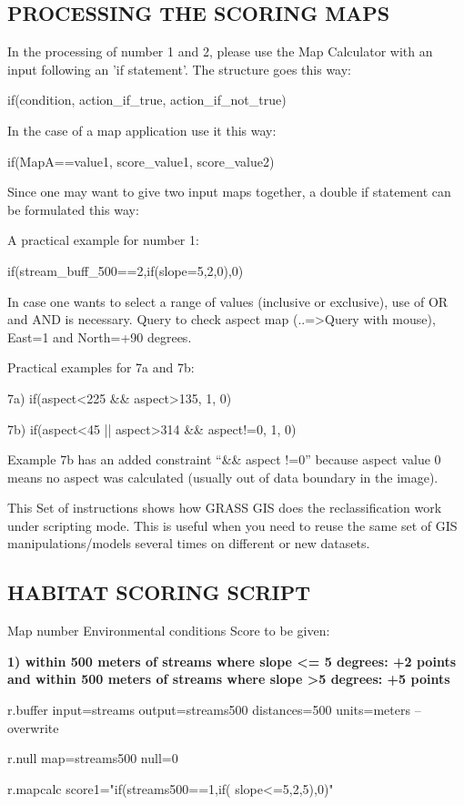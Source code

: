 \subsection{PROCESSING THE SCORING MAPS}

In the processing of number 1 and 2, please use the Map Calculator with an input following an 'if statement'. The structure goes this
way:
\begin{smallverbatim}
if(condition, action_if_true, action_if_not_true)
\end{smallverbatim}
In the case of a map application use it this way:
\begin{smallverbatim}
if(MapA==value1, score_value1, score_value2)
\end{smallverbatim}
Since one may want to give two input maps together, a double if statement can be formulated this way:

A practical example for number 1:
\begin{smallverbatim}
if(stream_buff_500==2,if(slope=5,2,0),0)
\end{smallverbatim}
In case one wants to select a range of values (inclusive or exclusive), use of OR and AND is necessary. Query to check aspect map (..=>Query with mouse), East=1 and North=+90 degrees.

Practical examples for 7a and 7b:
\begin{smallverbatim}
7a) if(aspect<225 && aspect>135, 1, 0)

7b) if(aspect<45 || aspect>314 && aspect!=0, 1, 0)
\end{smallverbatim}
Example 7b has an added constraint ``\&\& aspect !=0'' because aspect value 0 means no aspect was calculated (usually out of data boundary in
the image).

This Set of instructions shows how GRASS GIS does the reclassification work under scripting mode. This is useful when you need to reuse the same set of GIS manipulations/models several times on different or new datasets.

\subsection{HABITAT SCORING SCRIPT}

Map number Environmental conditions Score to be given:

\textbf{
1) within 500 meters of streams where slope <= 5 degrees: +2 points and within 500 meters of streams where slope >5 degrees: +5 points}
\begin{smallverbatim}
r.buffer input=streams output=streams500
 distances=500 units=meters --overwrite

r.null map=streams500 null=0

r.mapcalc score1="if(streams500==1,if(
 slope<=5,2,5),0)"
\end{smallverbatim}

